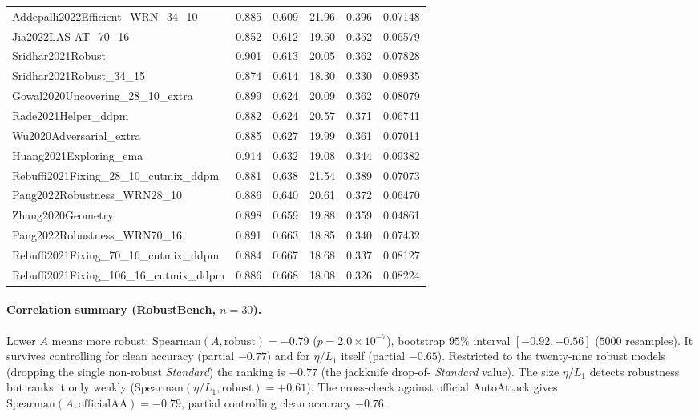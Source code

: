 \begin{table}[t]
\begin{tabular}{lrrrrr}
Addepalli2022Efficient\_WRN\_34\_10  & 0.885 & 0.609 & 21.96 & 0.396 & 0.07148 \\
Jia2022LAS-AT\_70\_16                & 0.852 & 0.612 & 19.50 & 0.352 & 0.06579 \\
Sridhar2021Robust                    & 0.901 & 0.613 & 20.05 & 0.362 & 0.07828 \\
Sridhar2021Robust\_34\_15            & 0.874 & 0.614 & 18.30 & 0.330 & 0.08935 \\
Gowal2020Uncovering\_28\_10\_extra   & 0.899 & 0.624 & 20.09 & 0.362 & 0.08079 \\
Rade2021Helper\_ddpm                 & 0.882 & 0.624 & 20.57 & 0.371 & 0.06741 \\
Wu2020Adversarial\_extra             & 0.885 & 0.627 & 19.99 & 0.361 & 0.07011 \\
Huang2021Exploring\_ema              & 0.914 & 0.632 & 19.08 & 0.344 & 0.09382 \\
Rebuffi2021Fixing\_28\_10\_cutmix\_ddpm & 0.881 & 0.638 & 21.54 & 0.389 & 0.07073 \\
Pang2022Robustness\_WRN28\_10        & 0.886 & 0.640 & 20.61 & 0.372 & 0.06470 \\
Zhang2020Geometry                    & 0.898 & 0.659 & 19.88 & 0.359 & 0.04861 \\
Pang2022Robustness\_WRN70\_16        & 0.891 & 0.663 & 18.85 & 0.340 & 0.07432 \\
Rebuffi2021Fixing\_70\_16\_cutmix\_ddpm & 0.884 & 0.667 & 18.68 & 0.337 & 0.08127 \\
Rebuffi2021Fixing\_106\_16\_cutmix\_ddpm & 0.886 & 0.668 & 18.08 & 0.326 & 0.08224 \\
\bottomrule
\end{tabular}
\end{table}

\paragraph{Correlation summary (RobustBench, $n{=}30$).} Lower $A$ means more
robust: $\mathrm{Spearman}(A,\text{robust})=-0.79$ ($p=2.0\times10^{-7}$),
bootstrap $95\%$ interval $[-0.92,-0.56]$ ($5000$ resamples). It survives
controlling for clean accuracy (partial $-0.77$) and for $\eta/L_1$ itself
(partial $-0.65$). Restricted to the twenty-nine robust models (dropping the
single non-robust \emph{Standard}) the ranking is $-0.77$ (the jackknife drop-of-%
\emph{Standard} value). The size $\eta/L_1$ detects robustness but ranks it only
weakly ($\mathrm{Spearman}(\eta/L_1,\text{robust})=+0.61$). The cross-check
against official AutoAttack gives $\mathrm{Spearman}(A,\text{officialAA})=-0.79$,
partial controlling clean accuracy $-0.76$.

